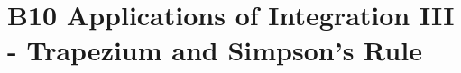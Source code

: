 \chapter{B10 Applications of Integration III - Trapezium and Simpson's Rule}


\clearpage

\clearpage
